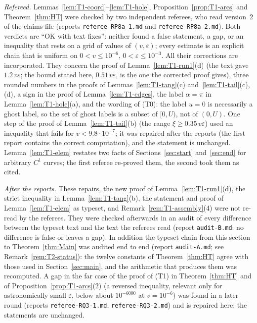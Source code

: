 \begin{remark}[Status]\label{rem:T1-status}
\emph{Refereed.} Lemmas~\ref{lem:T1-coord}--\ref{lem:T1-hole}, Proposition~\ref{prop:T1-arcs} and Theorem~\ref{thm:HT} were checked by
two independent referees, who read version~2 of the claims file (reports \texttt{referee-RP8a-1.md} and
\texttt{referee-RP8a-2.md}). Both verdicts are ``OK with text fixes'':
neither found a false statement, a gap, or an inequality that rests on a grid of values of $(v,\varepsilon)$; every estimate is an
explicit chain that is uniform on $0<v\le10^{-6}$, $0<\varepsilon\le10^{-3}$. All their corrections are incorporated. They concern
the proof of Lemma~\ref{lem:T1-run1}(d) (the text gave $1.2\,v\varepsilon$; the bound stated here, $0.51\,v\varepsilon$, is the one the
corrected proof gives), three rounded numbers in the proofs of Lemmas~\ref{lem:T1-tang}(c) and~\ref{lem:T1-tail}(c),(d), a sign in the
proof of Lemma~\ref{lem:T1-edges}, the label $\alpha=\pi$ in Lemma~\ref{lem:T1-hole}(a), and the wording of \textup{(T0)}: the label
$u=0$ is necessarily a ghost label, so the set of ghost labels is a subset of $[0,U)$, not of $(0,U)$. One step of the proof of Lemma~\ref{lem:T1-tail}(b) (the range $\xi\ge0.35\,v\varepsilon$) used an
inequality that fails for $v<9.8\cdot10^{-7}$; it was repaired after the reports (the first report contains the correct
computation), and the statement is unchanged. Lemma~\ref{lem:T1-elem} restates two facts of Sections~\ref{sec:start}
and~\ref{sec:end} for arbitrary $C^1$ curves; the first referee re-proved them, the second took them as cited.

\emph{After the reports.} These repairs, the new proof of Lemma~\ref{lem:T1-run1}(d), the strict inequality in
Lemma~\ref{lem:T1-tang}(b), the statement and proof of Lemma~\ref{lem:T1-elem} as typeset, and
Remark~\ref{rem:T1-assembly}(4) were not re-read by the referees. They were checked afterwards in an audit of every difference
between the typeset text and the text the referees read (report \texttt{audit-B.md}: no difference is false or leaves a gap). In
addition the typeset chain from this section to Theorem~\ref{thm:Main} was audited end to end (report \texttt{audit-A.md}; see
Remark~\ref{rem:T2-status}): the twelve constants of Theorem~\ref{thm:HT} agree with those used in Section~\ref{sec:main}, and
the arithmetic that produces them was recomputed. A gap in the far case of the proof of \textup{(T1)} in Theorem~\ref{thm:HT} and
of Proposition~\ref{prop:T1-arcs}(2) (a reversed inequality, relevant only for astronomically small $\varepsilon$, below about $10^{-6000}$ at $v=10^{-6}$) was found in a later
round (reports \texttt{referee-RQ3-1.md}, \texttt{referee-RQ3-2.md}) and is repaired here; the statements are unchanged.


\end{remark}
